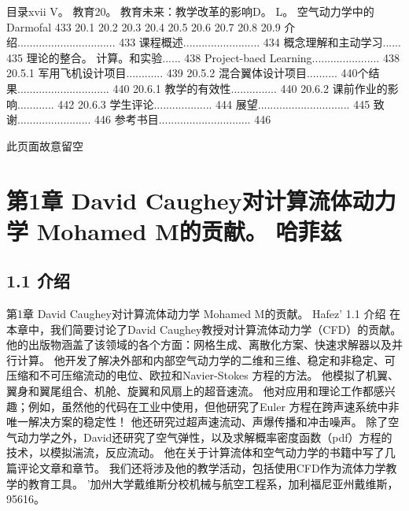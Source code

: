 \documentclass[UTF8,11pt,a4paper,openany,fontset=fandol]{ctexbook}
\begin{document}
目录xvii V。 教育20。 教育未来：教学改革的影响D。 L。 空气动力学中的Darmofal 433 20.1 20.2 20.3 20.4 20.5 20.6 20.7 20.8 20.9 介绍................................ 433 课程概述......................... 434 概念理解和主动学习...... 435 理论的整合。 计算。和实验...... 438 Project-baed Learning...................... 438 20.5.1 军用飞机设计项目............ 439 20.5.2 混合翼体设计项目.......... 440个结果.............................. 440 20.6.1 教学的有效性............... 440 20.6.2 课前作业的影响............ 442 20.6.3 学生评论................... 444 展望.............................. 445 致谢........................ 446 参考书目.............................. 446

此页面故意留空

\clearpage
\chapter{第1章 David Caughey对计算流体动力学 Mohamed M的贡献。 哈菲兹}
\section{1.1 介绍}
第1章 David Caughey对计算流体动力学 Mohamed M的贡献。 Hafez' 1.1 介绍 在本章中，我们简要讨论了David Caughey教授对计算流体动力学（CFD）的贡献。 他的出版物涵盖了该领域的各个方面：网格生成、离散化方案、快速求解器以及并行计算。 他开发了解决外部和内部空气动力学的二维和三维、稳定和非稳定、可压缩和不可压缩流动的电位、欧拉和Navier-Stokes 方程的方法。 他模拟了机翼、翼身和翼尾组合、机舱、旋翼和风扇上的超音速流。 他对应用和理论工作都感兴趣；例如，虽然他的代码在工业中使用，但他研究了Euler 方程在跨声速系统中非唯一解决方案的稳定性！ 他还研究过超声速流动、声爆传播和冲击噪声。 除了空气动力学之外，David还研究了空气弹性，以及求解概率密度函数（pdf）方程的技术，以模拟湍流，反应流动。 他在关于计算流体和空气动力学的书籍中写了几篇评论文章和章节。 我们还将涉及他的教学活动，包括使用CFD作为流体力学教学的教育工具。 '加州大学戴维斯分校机械与航空工程系，加利福尼亚州戴维斯，95616。
\end{document}
